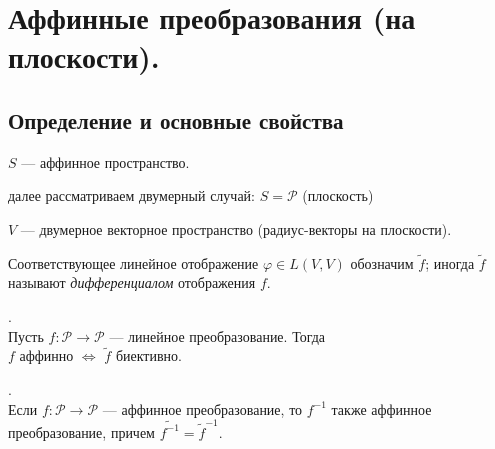 \section{Аффинные преобразования (на плоскости).}\label{aff}

\subsection{Определение и основные свойства}



$S$ --- аффинное пространство.

далее рассматриваем двумерный случай: $S=\mathcal{P}$ (плоскость) 

$V$ --- двумерное векторное пространство (радиус-векторы на плоскости).








Соответствующее линейное отображение $\varphi\in L(V,V)$ обозначим
$\widetilde{f}$; иногда $\widetilde{f}$ называют {\it дифференциалом} отображения $f$.




\begin{predl}\label{p4_2_3}.\\
Пусть $f: \mathcal{P}\to \mathcal{P}$ --- линейное преобразование.
Тогда \\ $f$ аффинно $\Leftrightarrow$ $\widetilde{f}$ биективно.
\end{predl}


\begin{predl}\label{p4_2_4}.\\
Если $f: \mathcal{P} \to \mathcal{P}$ --- аффинное преобразование, то
$f^{-1}$  также аффинное преобразование, причем $\widetilde{f^{-1}} = \widetilde{f}^{-1}$.
\end{predl}


